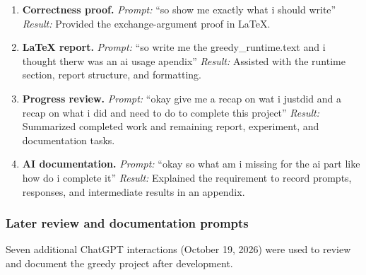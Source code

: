 \begin{enumerate}
\item \textbf{Correctness proof.}
\emph{Prompt:} ``so show me exactly what i should
write''
\emph{Result:} Provided the exchange-argument proof in
LaTeX.

\item \textbf{LaTeX report.}
\emph{Prompt:} ``so write me the greedy\_runtime.text
and i thought therw was an ai usage apendix''
\emph{Result:} Assisted with the runtime section,
report structure, and formatting.

\item \textbf{Progress review.}
\emph{Prompt:} ``okay give me a recap on wat i justdid
and a recap on what i did and need to do to complete
this project''
\emph{Result:} Summarized completed work and remaining
report, experiment, and documentation tasks.

\item \textbf{AI documentation.}
\emph{Prompt:} ``okay so what am i missing for the ai
part like how do i complete it''
\emph{Result:} Explained the requirement to record
prompts, responses, and intermediate results in an
appendix.

\end{enumerate}

\subsubsection{Later review and documentation prompts}

Seven additional ChatGPT interactions (October 19,
2026) were used to review and document the greedy
project after development.

